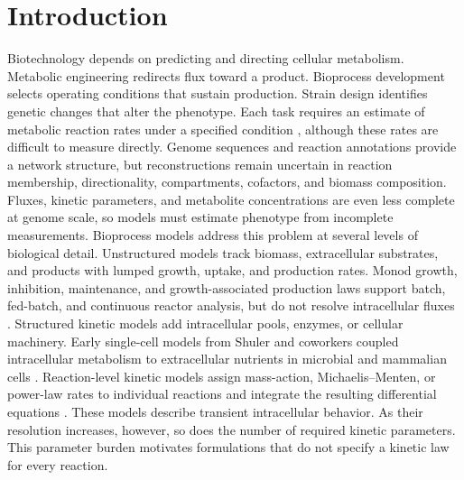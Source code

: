 \section{Introduction}\label{sec:intro}

Biotechnology depends on predicting and directing cellular metabolism.
Metabolic engineering redirects flux toward a product. Bioprocess development
selects operating conditions that sustain production. Strain design
identifies genetic changes that alter the phenotype. Each task
requires an estimate of metabolic reaction rates under a specified condition
\cite{Bordbar2014}, although these rates are difficult to measure directly.
Genome sequences and reaction annotations provide a network structure, but
reconstructions remain uncertain in reaction membership, directionality,
compartments, cofactors, and biomass composition. Fluxes, kinetic parameters,
and metabolite concentrations are even less complete at genome scale, so
models must estimate phenotype from incomplete measurements. Bioprocess
models address this problem at several levels of biological detail. Unstructured
models track biomass, extracellular substrates, and products with lumped
growth, uptake, and production rates. Monod growth, inhibition, maintenance,
and growth-associated production laws support batch, fed-batch, and
continuous reactor analysis, but do not resolve intracellular fluxes
\cite{Esener1983}. Structured kinetic models add intracellular pools,
enzymes, or cellular machinery. Early single-cell models from Shuler and
coworkers coupled intracellular metabolism to extracellular nutrients in
microbial and mammalian cells \cite{Domach1984,Wu1992}. Reaction-level
kinetic models assign mass-action, Michaelis--Menten, or power-law rates to
individual reactions and integrate the resulting differential equations
\cite{MichaelisMenten1913,Savageau1976,SavageauVoit1987,Vadhin2026}. These
models describe transient intracellular behavior. As their resolution
increases, however, so does the number of required kinetic parameters. This
parameter burden motivates formulations that do not specify a kinetic law for
every reaction.

